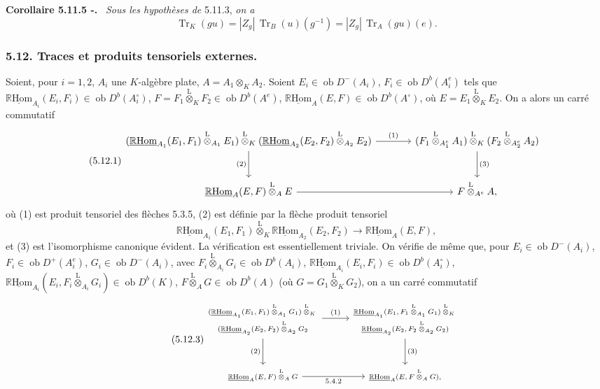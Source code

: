\documentclass[11pt]{article}
\newenvironment{statement}[1]{\par\medskip\noindent\textbf{#1.}\ }{\par\medskip}
\newcommand{\R}{\mathbb{R}}\newcommand{\RHomCore}{\mathbb{R}\mathrm{Hom}}
\newcommand{\ob}{\operatorname{ob}}
\providecommand{\RHom}{\RHomCore}
\providecommand{\uRHom}{\underline{\RHom}}
\providecommand{\Tr}{\operatorname{Tr}}
\providecommand{\Tr}{\operatorname{Tr}}
\providecommand{\lten}{\overset{\mathrm L}{\otimes}}
\providecommand{\Tr}{\operatorname{Tr}}
\providecommand{\RHom}{\RHomCore}
\providecommand{\ob}{\operatorname{ob}}
\providecommand{\lten}{\overset{\mathrm L}{\otimes}}
\providecommand{\RHom}{\R\mathcal{H}om}
\providecommand{\lten}{\overset{\mathrm L}{\otimes}}
\providecommand{\R}{\mathrm R}
\providecommand{\Tr}{\operatorname{Tr}}
\providecommand{\lten}{\overset{\mathrm L}{\otimes}}
\providecommand{\lten}{\overset{\mathrm L}{\otimes}}
\providecommand{\lten}{\overset{\mathrm L}{\otimes}}
\providecommand{\RHom}{\RHomCore}
\providecommand{\Tr}{\operatorname{Tr}}
\providecommand{\lten}{\overset{\mathrm L}{\otimes}}
\begin{document}
\begin{statement}{Corollaire 5.11.5 -}
\emph{Sous les hypothèses de} 5.11.3, \emph{on a}
\[
\Tr_K(gu)=|Z_g|\,\Tr_B(u)(g^{-1})=|Z_g|\,\Tr_A(gu)(e).
\]
\end{statement}

\subsubsection*{5.12. Traces et produits tensoriels externes.}

Soient, pour $i=1,2$, $A_i$ une $K$-algèbre plate, $A=A_1\otimes_KA_2$. Soient $E_i\in\ob D^-(A_i)$, $F_i\in\ob D^b(A_i^e)$ tels que $\uRHom_{A_i}(E_i,F_i)\in\ob D^b(A_i^\circ)$, $F=F_1\lten_KF_2\in\ob D^b(A^e)$, $\uRHom_A(E,F)\in\ob D^b(A^\circ)$, où $E=E_1\lten_KE_2$. On a alors un carré commutatif
\begin{equation}\tag{5.12.1}
\begin{tikzcd}[column sep=large,row sep=large]
(\uRHom_{A_1}(E_1,F_1)\lten_{A_1}E_1)\lten_K(\uRHom_{A_2}(E_2,F_2)\lten_{A_2}E_2) \arrow[r,"(1)"] \arrow[d,"(2)"'] & (F_1\lten_{A_1^e}A_1)\lten_K(F_2\lten_{A_2^e}A_2) \arrow[d,"(3)"]\\
\uRHom_A(E,F)\lten_AE \arrow[r] & F\lten_{A^e}A,
\end{tikzcd}
\end{equation}
où (1) est produit tensoriel des flèches 5.3.5, (2) est définie par la flèche produit tensoriel
\begin{equation}\tag{5.12.2}
\uRHom_{A_1}(E_1,F_1)\lten_K\uRHom_{A_2}(E_2,F_2)\longrightarrow\uRHom_A(E,F),
\end{equation}
et (3) est l'isomorphisme canonique évident. La vérification est essentiellement triviale. On vérifie de même que, pour $E_i\in\ob D^-(A_i)$, $F_i\in\ob D^+(A_i^e)$, $G_i\in\ob D^-(A_i)$, avec $F_i\lten_{A_i}G_i\in\ob D^b(A_i)$, $\uRHom_{A_i}(E_i,F_i)\in\ob D^b(A_i^\circ)$, $\uRHom_{A_i}(E_i,F_i\lten_{A_i}G_i)\in\ob D^b(K)$, $F\lten_AG\in\ob D^b(A)$ (où $G=G_1\lten_KG_2$), on a un carré commutatif
\begin{equation}\tag{5.12.3}
\begin{tikzcd}[column sep=2.8em,row sep=large,cells={nodes={font=\scriptsize}},every label/.append style={font=\scriptsize}]
\begin{gathered}
(\uRHom_{A_1}(E_1,F_1)\lten_{A_1}G_1)\lten_K{}\\[-.15em]
(\uRHom_{A_2}(E_2,F_2)\lten_{A_2}G_2
\end{gathered}
\arrow[r,"(1)"] \arrow[d,"(2)"']
&
\begin{gathered}
\uRHom_{A_1}(E_1,F_1\lten_{A_1}G_1)\lten_K{}\\[-.15em]
\uRHom_{A_2}(E_2,F_2\lten_{A_2}G_2)
\end{gathered}
\arrow[d,"(3)"]\\
\uRHom_A(E,F)\lten_AG \arrow[r,"5.4.2"'] & \uRHom_A(E,F\lten_AG),
\end{tikzcd}
\end{equation}
\end{document}
